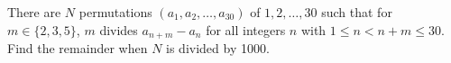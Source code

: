There are $N$ permutations $(a_1,a_2,\dots,a_{30})$ of $1,2,\dots,30$ such that for $m\in\{2,3,5\}$, $m$ divides $a_{n+m}-a_n$ for all integers $n$ with $1\leq n <n+m\leq 30$. Find the remainder when $N$ is divided by 1000.